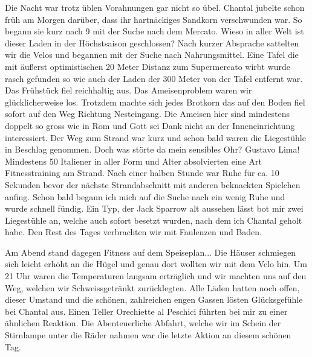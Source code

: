 Die Nacht war trotz üblen Vorahnungen gar nicht so übel.
Chantal jubelte schon früh am Morgen darüber, dass ihr hartnäckiges Sandkorn verschwunden war.
So begann sie kurz nach 9 mit der Suche nach dem Mercato.
Wieso in aller Welt ist dieser Laden in der Höchstsaison geschlossen? Nach kurzer Absprache sattelten wir die Velos und begannen mit der Suche nach Nahrungsmittel.
Eine Tafel die mit äußerst optimistischen 20 Meter Distanz zum Supermercato wirbt wurde rasch gefunden so wie auch der Laden der 300 Meter von der Tafel entfernt war.
Das Frühstück fiel reichhaltig aus.
Das Ameisenproblem waren wir glücklicherweise los.
Trotzdem machte sich jedes Brotkorn das auf den Boden fiel sofort auf den Weg Richtung Nesteingang.
Die Ameisen hier sind mindestens doppelt so gross wie in Rom und Gott sei Dank nicht an der Inneneinrichtung interessiert.
Der Weg zum Strand war kurz und schon bald waren die Liegestühle in Beschlag genommen.
Doch was störte da mein sensibles Ohr? Gustavo Lima! Mindestens 50 Italiener in aller Form und Alter absolvierten eine Art Fitnesstraining am Strand.
Nach einer halben Stunde war Ruhe für ca.  10 Sekunden bevor der nächste Strandabschnitt mit anderen beknackten Spielchen anfing.
Schon bald begann ich mich auf die Suche nach ein wenig Ruhe und wurde schnell fündig.
Ein Typ, der Jack Sparrow alt aussehen lässt bot mir zwei Liegestühle an, welche auch sofort besetzt wurden, nach dem ich Chantal geholt habe.
Den Rest des Tages verbrachten wir mit Faulenzen und Baden.

Am Abend stand dagegen Fitness auf dem Speiseplan... Die Häuser schmiegen sich leicht erhöht an die Hügel und genau dort wollten wir mit dem Velo hin.
Um 21 Uhr waren die Temperaturen langsam erträglich und wir machten uns auf den Weg, welchen wir Schweissgetränkt zurücklegten.
Alle Läden hatten noch offen, dieser Umstand und die schönen, zahlreichen engen Gassen lösten Glücksgefühle bei Chantal aus.
Einen Teller Orechiette al Peschici führten bei mir zu einer ähnlichen Reaktion.
Die Abenteuerliche Abfahrt, welche wir im Schein der Stirnlampe unter die Räder nahmen war die letzte Aktion an diesem schönen Tag.

